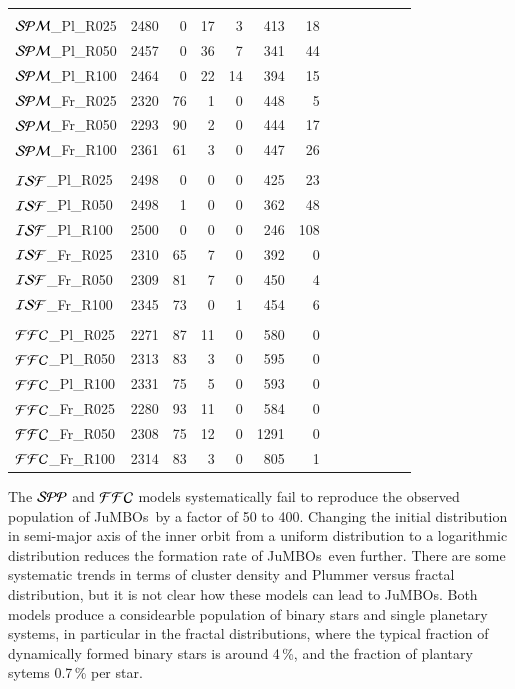 \documentclass[submission,phys]{lib/SciPost}
\newcommand{\jumbos}{\mbox{JuMBOs}}
\begin{document}
\begin{table}
\begin{tabular}{lrrrrrrrrrrrr}
 \hline
  \hline \vspace{-0.75em}\\
${\cal SPM}$\_Pl\_R025 &  2480 & 0 & 17 & 3 & 413 & 18 \\
${\cal SPM}$\_Pl\_R050 &  2457 & 0 & 36 & 7 & 341 & 44 \\
${\cal SPM}$\_Pl\_R100 &  2464 & 0 & 22 & 14 & 394 & 15 \\
${\cal SPM}$\_Fr\_R025 &  2320 & 76 & 1 & 0 & 448 & 5 \\ 
${\cal SPM}$\_Fr\_R050 &  2293 & 90 & 2 & 0 & 444 & 17 \\
${\cal SPM}$\_Fr\_R100 &  2361 & 61 & 3 & 0 & 447 & 26 \\
  \hline
  \hline \vspace{-0.75em}\\
${\cal ISF}$\_Pl\_R025 &  2498 & 0 & 0 & 0 & 425 & 23 \\
${\cal ISF}$\_Pl\_R050 &  2498 & 1 & 0 & 0 & 362 & 48 \\
${\cal ISF}$\_Pl\_R100 &  2500 & 0 & 0 & 0 & 246 & 108 \\
${\cal ISF}$\_Fr\_R025 &  2310 & 65 & 7 & 0 & 392 & 0 \\
${\cal ISF}$\_Fr\_R050 &  2309 & 81 & 7 & 0 & 450 & 4 \\
${\cal ISF}$\_Fr\_R100 &  2345 & 73 & 0 & 1 & 454 & 6 \\
  \hline
  \hline \vspace{-0.75em}\\
${\cal FFC}$\_Pl\_R025 &  2271 & 87 & 11 & 0 & 580 & 0 \\
${\cal FFC}$\_Pl\_R050 &  2313 & 83 & 3 & 0 & 595 & 0 \\
${\cal FFC}$\_Pl\_R100 &  2331 & 75 & 5 & 0 & 593 & 0 \\
${\cal FFC}$\_Fr\_R025 &  2280 & 93 & 11 & 0 & 584 & 0 \\
${\cal FFC}$\_Fr\_R050 &  2308 & 75 & 12 & 0 & 1291 & 0 \\
${\cal FFC}$\_Fr\_R100 &  2314 & 83 & 3 & 0 & 805 & 1 \\
  \hline
 \end{tabular}
\end{table}

The ${\cal SPP}$ and ${\cal FFC}$ models systematically fail to
reproduce the observed population of \jumbos\, by a factor of 50 to
400. Changing the initial distribution in semi-major axis of the inner
orbit from a uniform distribution to a logarithmic distribution
reduces the formation rate of \jumbos\, even further.  There are some
systematic trends in terms of cluster density and Plummer versus
fractal distribution, but it is not clear how these models can lead to
\jumbos. Both models produce a considearble population of binary stars
and single planetary systems, in particular in the fractal
distributions, where the typical fraction of dynamically formed binary
stars is around 4\,\%, and the fraction of plantary sytems 0.7\,\% per
star.
\end{document}
